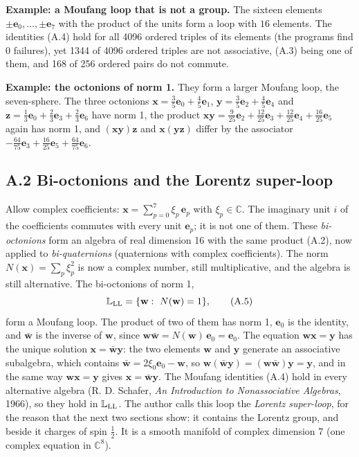 \documentclass[
  10pt,
]{article}
\begin{document}
\textbf{Example: a Moufang loop that is not a group.} The sixteen
elements \(\pm\mathbf e_0,\dots,\pm\mathbf e_7\) with the product of the
units form a loop with \(16\) elements. The identities (A.4) hold for
all 4096 ordered triples of its elements (the programs find \(0\)
failures), yet 1344 of 4096 ordered triples are not associative, (A.3)
being one of them, and 168 of 256 ordered pairs do not commute.

\textbf{Example: the octonions of norm 1.} They form a larger Moufang
loop, the seven-sphere. The three octonions
\(\mathbf x=\tfrac{3}{5}\mathbf e_{0}+\tfrac{4}{5}\mathbf e_{1}\),
\(\mathbf y=\tfrac{3}{5}\mathbf e_{2}+\tfrac{4}{5}\mathbf e_{4}\) and
\(\mathbf z=\tfrac{1}{3}\mathbf e_{0}+\tfrac{2}{3}\mathbf e_{3}+\tfrac{2}{3}\mathbf e_{6}\)
have norm 1, the product
\(\mathbf x\mathbf y=\tfrac{9}{25}\mathbf e_{2}+\tfrac{12}{25}\mathbf e_{3}+\tfrac{12}{25}\mathbf e_{4}+\tfrac{16}{25}\mathbf e_{5}\)
again has norm 1, and \((\mathbf x\mathbf y)\mathbf z\) and
\(\mathbf x(\mathbf y\mathbf z)\) differ by the associator
\(-\tfrac{64}{75}\mathbf e_{3}+\tfrac{16}{25}\mathbf e_{5}+\tfrac{64}{75}\mathbf e_{6}\).

\hypertarget{a.2-bi-octonions-and-the-lorentz-super-loop}{%
\subsection{A.2 Bi-octonions and the Lorentz
super-loop}\label{a.2-bi-octonions-and-the-lorentz-super-loop}}

Allow complex coefficients: \(\mathbf x=\sum_{p=0}^7\xi_p\,\mathbf e_p\)
with \(\xi_p\in\mathbb C\). The imaginary unit \(i\) of the coefficients
commutes with every unit \(\mathbf e_p\); it is not one of them. These
\emph{bi-octonions} form an algebra of real dimension 16 with the same
product (A.2), now applied to \emph{bi-quaternions} (quaternions with
complex coefficients). The norm \(N(\mathbf x)=\sum_p\xi_p^2\) is now a
complex number, still multiplicative, and the algebra is still
alternative. The bi-octonions of norm 1,
\[\mathbb L_{\rm LL}=\{\mathbf w:\ N(\mathbf w)=1\},\tag{A.5}\] form a
Moufang loop. The product of two of them has norm 1, \(\mathbf e_0\) is
the identity, and \(\bar{\mathbf w}\) is the inverse of \(\mathbf w\),
since
\(\mathbf w\bar{\mathbf w}=N(\mathbf w)\,\mathbf e_0=\mathbf e_0\). The
equation \(\mathbf w\mathbf x=\mathbf y\) has the unique solution
\(\mathbf x=\bar{\mathbf w}\mathbf y\): the two elements \(\mathbf w\)
and \(\mathbf y\) generate an associative subalgebra, which contains
\(\bar{\mathbf w}=2\xi_0\mathbf e_0-\mathbf w\), so
\(\mathbf w(\bar{\mathbf w}\mathbf y)=(\mathbf w\bar{\mathbf w})\mathbf y=\mathbf y\),
and in the same way \(\mathbf w\mathbf x=\mathbf y\) gives
\(\mathbf x=\bar{\mathbf w}\mathbf y\). The Moufang identities (A.4)
hold in every alternative algebra (R. D. Schafer, \emph{An Introduction
to Nonassociative Algebras}, 1966), so they hold in
\(\mathbb L_{\rm LL}\). The author calls this loop the \emph{Lorentz
super-loop}, for the reason that the next two sections show: it contains
the Lorentz group, and beside it charges of spin \(\tfrac12\). It is a
smooth manifold of complex dimension 7 (one complex equation in
\(\mathbb C^8\)).
\end{document}
